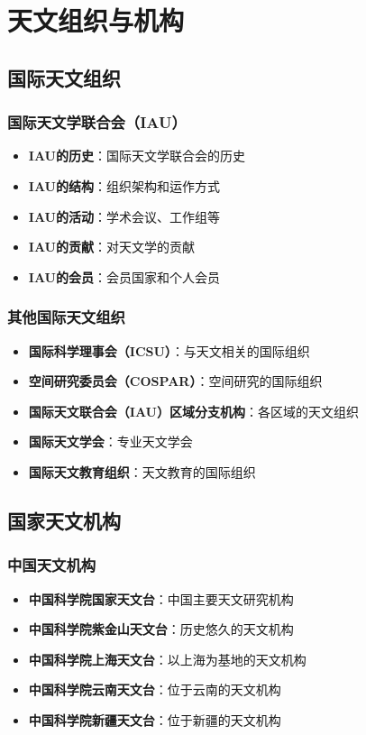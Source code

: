 \documentclass[12pt,UTF8]{ctexbook}
\begin{document}
\part{天文组织与机构}

\chapter{国际天文组织}
\section{国际天文学联合会（IAU）}

\begin{itemize}
  \item \textbf{IAU的历史}：国际天文学联合会的历史
  \item \textbf{IAU的结构}：组织架构和运作方式
  \item \textbf{IAU的活动}：学术会议、工作组等
  \item \textbf{IAU的贡献}：对天文学的贡献
  \item \textbf{IAU的会员}：会员国家和个人会员
\end{itemize}

\section{其他国际天文组织}

\begin{itemize}
  \item \textbf{国际科学理事会（ICSU）}：与天文相关的国际组织
  \item \textbf{空间研究委员会（COSPAR）}：空间研究的国际组织
  \item \textbf{国际天文联合会（IAU）区域分支机构}：各区域的天文组织
  \item \textbf{国际天文学会}：专业天文学会
  \item \textbf{国际天文教育组织}：天文教育的国际组织
\end{itemize}

\chapter{国家天文机构}
\section{中国天文机构}

\begin{itemize}
  \item \textbf{中国科学院国家天文台}：中国主要天文研究机构
  \item \textbf{中国科学院紫金山天文台}：历史悠久的天文机构
  \item \textbf{中国科学院上海天文台}：以上海为基地的天文机构
  \item \textbf{中国科学院云南天文台}：位于云南的天文机构
  \item \textbf{中国科学院新疆天文台}：位于新疆的天文机构
\end{itemize}
\end{document}
